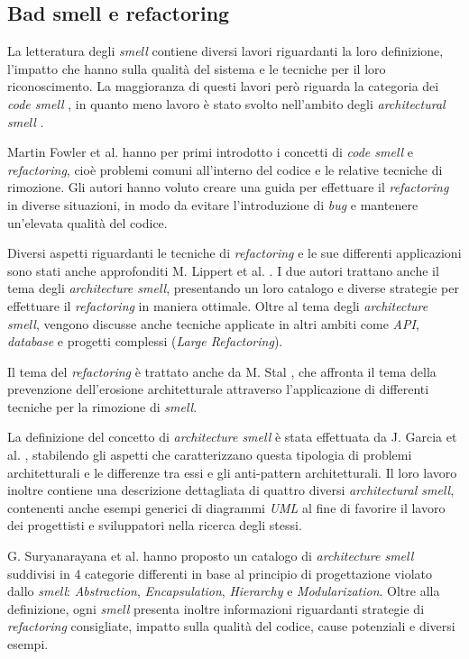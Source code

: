 \subsection{Bad smell e refactoring}
La letteratura degli \textit{smell} contiene diversi lavori riguardanti la loro definizione, l'impatto che hanno sulla qualità del sistema e le tecniche per il loro riconoscimento. La maggioranza di questi lavori però riguarda la categoria dei \textit{code smell} \cite{fowler2018refactoring}, in quanto meno lavoro è stato svolto nell'ambito degli \textit{architectural smell} \cite{AzadiFontana}.

Martin Fowler et al. \cite{fowler2018refactoring} hanno per primi introdotto i concetti di \textit{code smell} e \textit{refactoring}, cioè problemi comuni all'interno del codice e le relative tecniche di rimozione. Gli autori hanno voluto creare una guida per effettuare il \textit{refactoring} in diverse situazioni, in modo da evitare l'introduzione di \textit{bug} e mantenere un'elevata qualità del codice.

Diversi aspetti riguardanti le tecniche di \textit{refactoring} e le sue differenti applicazioni sono stati anche approfonditi M. Lippert et al. \cite{lippert2006refactoring}. I due autori trattano anche il tema degli \textit{architecture smell}, presentando un loro catalogo e diverse strategie per effettuare il \textit{refactoring} in maniera ottimale. Oltre al tema degli \textit{architecture smell}, vengono discusse anche tecniche applicate in altri ambiti come \textit{API}, \textit{database} e progetti complessi (\textit{Large Refactoring}).

Il tema del \textit{refactoring} è trattato anche da M. Stal \cite{stal2014refactoring}, che affronta il tema della prevenzione dell'erosione architetturale attraverso l'applicazione di differenti tecniche per la rimozione di \textit{smell}.

La definizione del concetto di \textit{architecture smell} è stata effettuata da J. Garcia et al. \cite{Garcia2009}, stabilendo gli aspetti che caratterizzano questa tipologia di problemi architetturali e le differenze tra essi e gli anti-pattern architetturali. Il loro lavoro inoltre contiene una descrizione dettagliata di quattro diversi \textit{architectural smell}, contenenti anche esempi generici di diagrammi \textit{UML} al fine di favorire il lavoro dei progettisti e sviluppatori nella ricerca degli stessi.

G. Suryanarayana et al. \cite{SURYANARAYANA201521} hanno proposto un catalogo di \textit{architecture smell} suddivisi in 4 categorie differenti in base al principio di progettazione \cite{booch2008object} violato dallo \textit{smell}: \textit{Abstraction}, \textit{Encapsulation}, \textit{Hierarchy} e \textit{Modularization}. Oltre alla definizione, ogni \textit{smell} presenta inoltre informazioni riguardanti strategie di \textit{refactoring} consigliate, impatto sulla qualità del codice, cause potenziali e diversi esempi.

